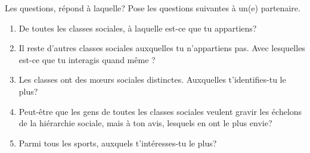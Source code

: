 \begin{frame}{Les questions, répond à laquelle?}
  Pose les questions suivantes à un(e) partenaire.
  \begin{enumerate}
    \item De toutes les classes sociales, à laquelle est-ce que tu appartiens?
    \item Il reste d'autres classes sociales auxquelles tu n'appartiens pas. Avec lesquelles est-ce que tu interagis quand même ?
    \item Les classes ont des mœurs sociales distinctes. Auxquelles t'identifies-tu le plus?
    \item Peut-être que les gens de toutes les classes sociales veulent gravir les échelons de la hiérarchie sociale, mais à ton avis, lesquels en ont le plus envie?
    \item Parmi tous les sports, auxquels t'intéresses-tu le plus?
  \end{enumerate}
\end{frame}